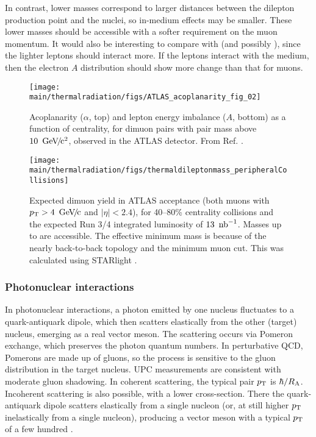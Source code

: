 \documentclass[../report.tex]{subfiles}
\providecommand{\main}{..}
\begin{document}
In contrast, lower masses correspond to larger distances between the dilepton production point and the nuclei, so in-medium effects may be smaller.  These lower masses should be accessible with a softer requirement on the muon momentum.   It would also be interesting to compare \Pepem with \PGmpGmm (and possibly \PGtp\PGtm), since the lighter leptons should interact more.  If the leptons interact with the medium, then the electron $A$ distribution should show more change than that for muons.  

\begin{figure}[htb]
\centering
\texttt{[image: \\main/thermalradiation/figs/ATLAS\_acoplanarity\_fig\_02]}
\caption{Acoplanarity ($\alpha$, top) and lepton energy imbalance ($A$, bottom) as a function of centrality, for dimuon pairs with pair mass above $\unit[10]{\UGeVcc}$, observed in the ATLAS detector.  From Ref. \cite{Aaboud:2018eph}.}
\label{fig:ATLASacoplanarity}
\end{figure}

\begin{figure}[htb]
\centering
\texttt{[image: \\main/thermalradiation/figs/thermaldileptonmass\_peripheralCollisions]}
\caption{Expected dimuon yield in ATLAS acceptance (both muons with $\pT>\unit[4]{\UGeVc}$ and $|\eta|<2.4$), for 40--80\% centrality \PbPb{} collisions and the expected Run 3/4 integrated luminosity of $\unit[13]{\Unb^{-1}}$.  Masses up to \unit[100]{\UGeVcc} are accessible.  The effective \unit[8]{\UGeVcc} minimum mass is because of the nearly back-to-back topology and the \unit[4]{\UGeVc} minimum muon \pT{} cut. This was calculated using STARlight \cite{Klein:2016yzr,Klein:2018cjh}.
}
\label{fig:project} 
\end{figure}


\subsubsection{Photonuclear interactions}

In photonuclear interactions, a photon emitted by one nucleus fluctuates to a quark-antiquark dipole, which then scatters elastically from the other (target) nucleus, emerging as a real vector meson.  The scattering occurs via Pomeron exchange, which preserves the photon quantum numbers.  In perturbative QCD, Pomerons are made up of gluons, so the process is sensitive to the gluon distribution in the target nucleus.  UPC measurements are consistent with moderate gluon shadowing.   In coherent scattering, the typical pair $p\sb{\scriptstyle\mathrm{T}}$ is $\hbar/R_{\rm A}$.  Incoherent scattering is also possible, with a lower cross-section.  There the quark-antiquark dipole scatters elastically from a single nucleon (or, at still higher $p\sb{\scriptstyle\mathrm{T}}$ inelastically from a single nucleon), producing a vector meson with a typical $p\sb{\scriptstyle\mathrm{T}}$ of a few hundred \unit[]{\UMeVc}.
\end{document}
